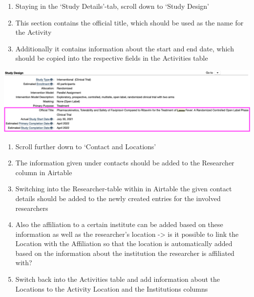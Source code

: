 \documentclass[
]{book}
\begin{document}
\begin{enumerate}
\def\labelenumi{\arabic{enumi}.}
\setcounter{enumi}{6}
\item
  Staying in the `Study Details'-tab, scroll down to `Study Design'
\item
  This section contains the official title, which should be used as the name for the Activity
\item
  Additionally it contains information about the start and end date, which should be copied into the respective fields in the Activities table
\end{enumerate}

\includegraphics{images/clinicaltrial5.png}

\begin{enumerate}
\def\labelenumi{\arabic{enumi}.}
\setcounter{enumi}{9}
\item
  Scroll further down to `Contact and Locations'
\item
  The information given under contacts should be added to the Researcher column in Airtable
\item
  Switching into the Researcher-table within in Airtable the given contact details should be added to the newly created entries for the involved researchers
\item
  Also the affiliation to a certain institute can be added based on these information as well as the researcher's location -\textgreater{} is it possible to link the Location with the Affiliation so that the location is automatically added based on the information about the institution the researcher is affiliated with?
\item
  Switch back into the Activities table and add information about the Locations to the Activity Location and the Institutions columns
\end{enumerate}
\end{document}
